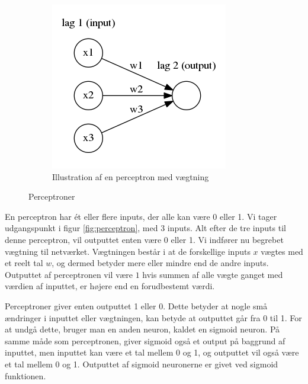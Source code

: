 \begin{figure}[h!]
\begin{subfigure}[b]{0.4\textwidth}
        \includegraphics[width=\textwidth]{images/neural2.png}
		\caption{Illustration af en perceptron med vægtning}
		\label{fig:perceptronWeight}
    \end{subfigure}
    
    \caption{Perceptroner}\label{fig:perceptroner}
\end{figure}



En perceptron har \'et eller flere inputs, der alle kan være 0 eller 1. Vi tager udgangspunkt i figur \ref{fig:perceptron}, med 3 inputs. Alt efter de tre inputs til denne perceptron, vil outputtet enten være 0 eller 1. Vi indfører nu begrebet vægtning til netværket. Vægtningen består i at de forskellige inputs $x$ vægtes med et reelt tal $w$, og dermed betyder mere eller mindre end de andre inputs. Outputtet af perceptronen vil være $1$ hvis summen af alle vægte ganget med værdien af inputtet, er højere end en forudbestemt værdi.


Perceptroner giver enten outputtet 1 eller 0. Dette betyder at nogle små ændringer i inputtet eller vægtningen, kan betyde at outputtet går fra 0 til 1. For at undgå dette, bruger man en anden neuron, kaldet en sigmoid neuron. På samme måde som perceptronen, giver sigmoid også et output på baggrund af inputtet, men inputtet kan være et tal mellem 0 og 1, og outputtet vil også være et tal mellem 0 og 1. Outputtet af sigmoid neuronerne er givet ved sigmoid funktionen\cite{neural}.

